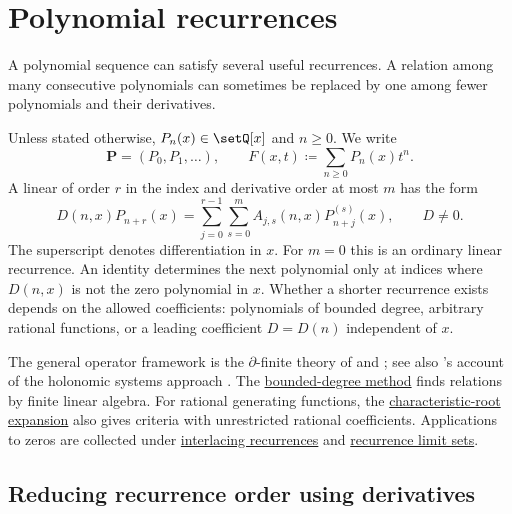 
\section[polynomialRecurrences]{Polynomial recurrences}

A polynomial sequence can satisfy several useful recurrences. A relation
among many consecutive polynomials can sometimes be replaced by one among
fewer polynomials and their derivatives.

Unless stated otherwise, $P_n(x)\in\setQ[x]$ and $n\geq0$. We write
\[
 \mathbf{P}=(P_0,P_1,\dotsc),\qquad
 F(x,t)\coloneqq\sum_{n\geq0}P_n(x)t^n.
\]
A linear  of order $r$ in the index
and derivative order at most $m$ has the form
\[
 D(n,x)P_{n+r}(x)
 =\sum_{j=0}^{r-1}\sum_{s=0}^{m}A_{j,s}(n,x)P_{n+j}^{(s)}(x),
 \qquad D\ne0.
\]
The superscript denotes differentiation in $x$. For $m=0$ this is an ordinary
linear recurrence. An identity determines the next polynomial
only at indices where $D(n,x)$ is not the zero polynomial in $x$.
Whether a shorter recurrence exists depends on the allowed coefficients:
polynomials of bounded degree, arbitrary rational functions, or a leading
coefficient $D=D(n)$ independent of $x$.

The general operator framework is the $\partial$-finite theory of
 and 
\cite[Sec.~2]{ChyzakSalvy1998}; see also 's
account of the holonomic systems approach \cite{Koutschan2009Thesis}.
The \hyperref[boundedRecurrenceSpaces]{bounded-degree method} finds relations
by finite linear algebra. For rational generating functions, the
\hyperref[recurrenceSpectralModel]{characteristic-root expansion} also gives
criteria with unrestricted rational coefficients.
Applications to zeros are collected under
\hyperref[interlacingDelayRecurrences]{interlacing recurrences} and
\hyperref[recurrenceZeroLimitSets]{recurrence limit sets}.

\subsection[recurrenceTradeoffExample]{Reducing recurrence order using derivatives}

